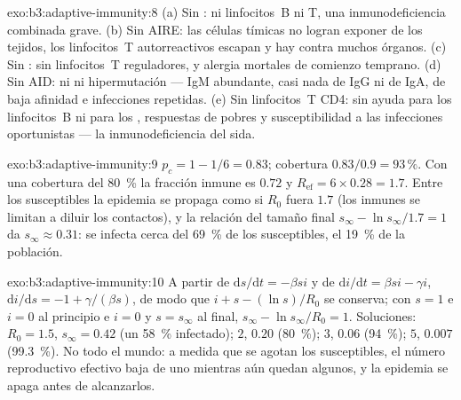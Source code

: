 \begin{solution}{exo:b3:adaptive-immunity:8}
(a) Sin : ni linfocitos~B ni T, una inmunodeficiencia
combinada grave. (b) Sin AIRE: las células tímicas no logran exponer
 de los tejidos, los linfocitos~T autorreactivos escapan y hay
 contra muchos órganos. (c) Sin : sin linfocitos~T
reguladores,  y alergia mortales de comienzo temprano.
(d) Sin AID: ni  ni hipermutación --- IgM abundante, casi
nada de IgG ni de IgA,  de baja afinidad e infecciones
repetidas. (e) Sin linfocitos~T CD4: sin ayuda para los linfocitos~B ni
para los , respuestas de  pobres y susceptibilidad a
las infecciones oportunistas --- la inmunodeficiencia del sida.
\end{solution}

\begin{solution}{exo:b3:adaptive-immunity:9}
$p_{c} = 1 - 1/6 = 0.83$; cobertura $0.83/0.9 = 93\,\%$. Con una
cobertura del \qty{80}{\%} la fracción inmune es $0.72$ y
$R_{\text{ef}} = 6\times 0.28
= 1.7$. Entre los susceptibles la epidemia se propaga como si $R_{0}$
fuera $1.7$ (los inmunes se limitan a diluir los contactos), y la
relación del tamaño final $s_{\infty} - \ln s_{\infty}/1.7 = 1$ da
$s_{\infty}
\approx 0.31$: se infecta cerca del \qty{69}{\%} de los susceptibles, el
\qty{19}{\%} de la población.
\end{solution}

\begin{solution}{exo:b3:adaptive-immunity:10}
A partir de $\mathrm{d}s/\mathrm{d}t = -\beta si$ y de
$\mathrm{d}i/\mathrm{d}t
= \beta si - \gamma i$, $\mathrm{d}i/\mathrm{d}s = -1 + \gamma/(\beta s)$,
de modo que $i + s - (\ln s)/R_{0}$ se conserva; con $s = 1$ e $i = 0$ al
principio e $i = 0$ y $s = s_{\infty}$ al final, $s_{\infty} - \ln
s_{\infty}/R_{0} = 1$. Soluciones: $R_{0} = 1.5$, $s_{\infty} = 0.42$
(un \qty{58}{\%} infectado); $2$, $0.20$ (\qty{80}{\%}); $3$, $0.06$
(\qty{94}{\%}); $5$, $0.007$ (\qty{99.3}{\%}). No todo el mundo: a medida
que se agotan los susceptibles, el número reproductivo efectivo baja de
uno mientras aún quedan algunos, y la epidemia se apaga antes de
alcanzarlos.
\end{solution}


